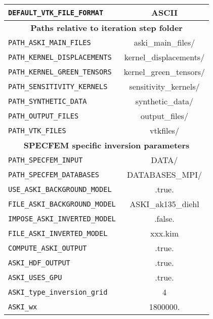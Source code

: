\begin{longtable}{|p{10.0cm}|c|}
   \verb+DEFAULT_VTK_FILE_FORMAT+        &   ASCII                         \\ \hline
	\multicolumn{2}{|c|}{\textbf{Paths relative to iteration step folder}}  \\ \hline
   \verb+PATH_ASKI_MAIN_FILES+           &   aski\_main\_files/            \\ \hline
   \verb+PATH_KERNEL_DISPLACEMENTS+      &   kernel\_displacements/        \\ \hline
   \verb+PATH_KERNEL_GREEN_TENSORS+      &   kernel\_green\_tensors/       \\ \hline
   \verb+PATH_SENSITIVITY_KERNELS+       &   sensitivity\_kernels/         \\ \hline
   \verb+PATH_SYNTHETIC_DATA+            &   synthetic\_data/              \\ \hline
   \verb+PATH_OUTPUT_FILES+              &   output\_files/                \\ \hline
   \verb+PATH_VTK_FILES+                 &   vtkfiles/                     \\ \hline
	\multicolumn{2}{|c|}{\textbf{SPECFEM specific inversion parameters}}    \\ \hline
   \verb+PATH_SPECFEM_INPUT +            &   DATA/                         \\ \hline
   \verb+PATH_SPECFEM_DATABASES +        &   DATABASES\_MPI/               \\ \hline
   \verb+USE_ASKI_BACKGROUND_MODEL+      &   .true.                        \\ \hline
   \verb+FILE_ASKI_BACKGROUND_MODEL+     &   ASKI\_ak135\_diehl            \\ \hline
   \verb+IMPOSE_ASKI_INVERTED_MODEL+     &   .false.                       \\ \hline
   \verb+FILE_ASKI_INVERTED_MODEL+       &   xxx.kim                       \\ \hline
   \verb+COMPUTE_ASKI_OUTPUT+            &   .true.                        \\ \hline
   \verb+ASKI_HDF_OUTPUT+                &   .true.                        \\ \hline
   \verb+ASKI_USES_GPU+                  &   .true.                        \\ \hline
   \verb+ASKI_type_inversion_grid+       &   4                             \\ \hline
   \verb+ASKI_wx+                        &   1800000.                      \\ \hline

\end{longtable}
